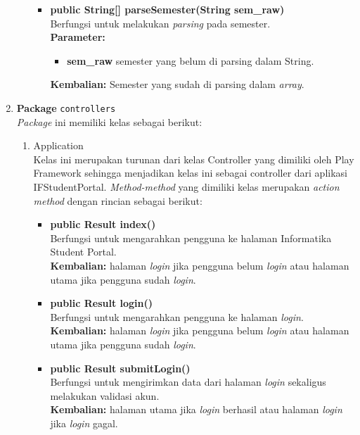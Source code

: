 \begin{enumerate}
\begin{enumerate}
\begin{itemize}
				\item \textbf{public String[] parseSemester(String sem\_raw)}\\
				Berfungsi untuk melakukan \textit{parsing} pada semester.\\
				\textbf{Parameter:}
					\begin{itemize}
						\item \textbf{sem\_raw} semester yang belum di parsing dalam String.
					\end{itemize}
					\textbf{Kembalian:} Semester yang sudah di parsing dalam \textit{array}.
			\end{itemize}
	\end{enumerate}
	\item \textbf{Package} \texttt{controllers}\\
	\textit{Package} ini memiliki kelas sebagai berikut:
	\begin{enumerate}
		\item Application\\
		Kelas ini merupakan turunan dari kelas Controller yang dimiliki oleh Play Framework sehingga menjadikan kelas ini sebagai controller dari aplikasi IFStudentPortal. \textit{Method-method} yang dimiliki kelas merupakan \textit{action method} dengan rincian sebagai berikut:
		\begin{itemize}
			\item \textbf{public Result index()}\\
				Berfungsi untuk mengarahkan pengguna ke halaman Informatika Student Portal.\\
				\textbf{Kembalian:} halaman \textit{login} jika pengguna belum \textit{login} atau halaman utama jika pengguna sudah \textit{login}.
				
				\item \textbf{public Result login()}\\
				Berfungsi untuk mengarahkan pengguna ke halaman \textit{login}.\\
				\textbf{Kembalian:} halaman \textit{login} jika pengguna belum \textit{login} atau halaman utama jika pengguna sudah \textit{login}.
				
				\item \textbf{public Result submitLogin()}\\
				Berfungsi untuk mengirimkan data dari halaman \textit{login} sekaligus melakukan validasi akun.\\
				\textbf{Kembalian:} halaman utama jika \textit{login} berhasil atau halaman \textit{login} jika \textit{login} gagal.
				

\end{itemize}
\end{enumerate}
\end{enumerate}

